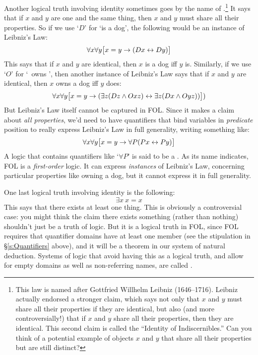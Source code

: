 Another logical truth involving identity sometimes goes by the name of .\footnote{This law is named after Gottfried Willhelm Leibniz (1646--1716).  Leibniz actually endorsed a stronger claim, which says not only that $x$ and $y$ must share all their properties if they are identical, but also (and more controversially!) that if $x$ and $y$ share all their properties, then they are identical.  This second claim is called the ``Identity of Indiscernibles.''  Can you think of a potential example of objects $x$ and $y$ that share all their properties but are still distinct?}  It says that if $x$ and $y$ are one and the same thing, then $x$ and $y$ must share all their properties. So if we use `$D$' for `\blank is a dog', the following would be an instance of Leibniz's Law:
$$\forall x \forall y\bigl[x = y \rightarrow (Dx \leftrightarrow Dy)\bigr]$$
This says that if $x$ and $y$ are identical, then $x$ is a dog iff $y$ is.  Similarly, if we use `$O$' for `\blank\ owns \blank', then another instance of Leibniz's Law says that if $x$ and $y$ are identical, then $x$ owns a dog iff $y$ does:
$$\forall x \forall y\bigl[x = y \rightarrow (\exists z(Dz \wedge Oxz) \leftrightarrow \exists z(Dx \wedge Oyz))\bigr])$$
But Leibniz's Law itself cannot be captured in FOL.  Since it makes a claim about \emph{all properties}, we'd need to have quantifiers that bind variables in \emph{predicate} position to really express Leibniz's Law in full generality, writing something like:
$$\forall x \forall y\bigl[x = y \rightarrow \forall P(Px \leftrightarrow Py)\bigr]$$
A logic that contains quantifiers like `$\forall P$' is said to be a .  As its name indicates, FOL is a \emph{first-order} logic.  It can express  \emph{instances} of Leibniz's Law, concerning particular properties like owning a dog, but it cannot express it in full generality.

One last logical truth involving identity is the following:
$$\exists x \ x=x$$
This says that there exists at least one thing. This is obviously a controversial case: you might think the claim there exists something (rather than nothing) shouldn't just be a truth of logic.  But it is a logical truth in FOL, since FOL requires that quantifier domains have at least one member (see the stipulation in \S \ref{s:Quantifiers} above), and it will be a theorem in our system of natural deduction.  Systems of logic that avoid having this as a logical truth, and allow for empty domains as well as non-referring names, are called .

\practiceproblems

